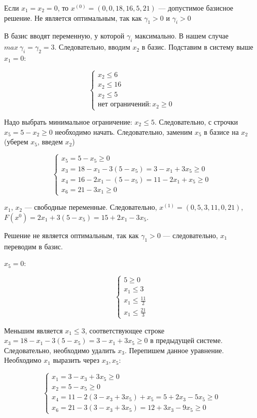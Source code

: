 \documentclass{article}
\begin{document}
Если $x_1 = x_2 = 0$, то $x^{(0)} = (0, 0, 18, 16, 5, 21)$ — допустимое базисное решение. Не является оптимальным, так как $\gamma_1 > 0$ и $\gamma_i > 0$

В базис вводят переменную, у которой $\gamma_i$ максимально. В нашем случае $max \ \gamma_i = \gamma_2 = 3$. Следовательно, вводим $x_2$ в базис. Подставим в систему выше $x_1 = 0$:

$$
\begin{cases}
  x_2 \le 6 \\
  x_2 \le 16 \\
  x_2 \le 5 \\
  \text{нет ограничений}: x_2 \ge 0
\end{cases}
$$

Надо выбрать минимальное ограничение: $x_2 \le 5$. Следовательно, с строчки $x_5 = 5 - x_2 \ge 0$ необходимо начать. Следовательно, заменим $x_5$ в базисе на $x_2$ (уберем $x_5$, введем $x_2$)

$$
\begin{cases}
    x_5 = 5 - x_5 \ge 0 \\
    x_3 = 18 - x_1 - 3 (5 - x_5) = 3 - x_1 + 3x_5 \ge 0\\
    x_4 = 16 - 2x_1 - (5 - x_5) = 11 - 2x_1 + x_5 \ge 0\\
    x_6 = 21 - 3x_1 \ge 0
\end{cases}
$$

$x_1$, $x_2$ — свободные переменные. Следовательно, $x^{(1)} = (0,5,3,11,0,21)$, $F(x^{0}) = 2x_1 + 3 (5 - x_5) = 15 + 2x_1 - 3x_5$.

Решение не является оптимальным, так как $\gamma_1 > 0$ — следовательно, $x_1$ переводим в базис.

$x_5 = 0$:

$$
\begin{cases}
    5 \ge 0 \\
    x_1 \le 3 \\
    x_1 \le \frac{11}{2} \\
    x_1 \le \frac{21}{3}  
\end{cases}
$$

Меньшим является $x_{1} \le 3$, соответствующее строке $x_3 = 18 - x_1 - 3 (5 - x_5) = 3 - x_1 + 3x_5 \ge 0$ в предыдущей системе. Следовательно, необходимо удалить $x_3$. Перепишем данное уравнение. Необходимо $x_1$ выразить через $x_3, x_5$:

$$\begin{cases}
    x_1 = 3 - x_3 + 3x_5 \ge 0 \\
    x_2 = 5 - x_5 \ge 0 \\
    x_4 = 11 - 2 (3 - x_3 + 3x_5) + x_5 = 5 + 2x_3 - 5x_5 \ge 0\\
    x_6 = 21 - 3 (3 - x_3 + 3x_5) = 12 + 3x_3 - 9x_5 \ge 0
\end{cases}$$
\end{document}
